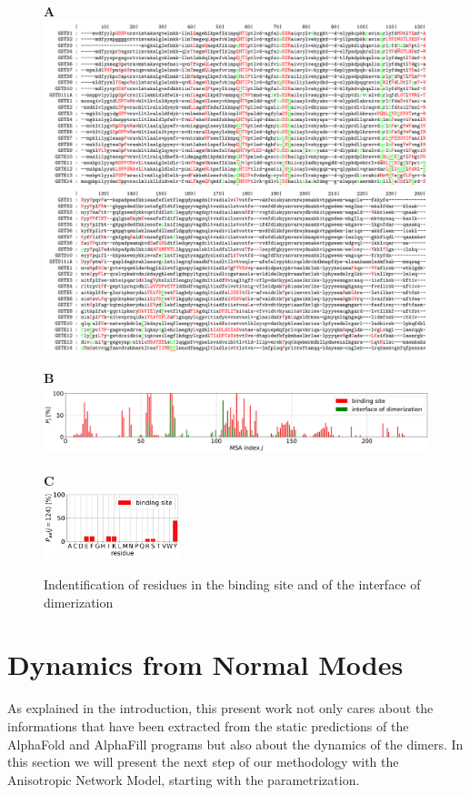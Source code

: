 \begin{figure}[h!]
	\label{MSA + AF + AFi}
	\raggedright\textbf{A}
	\includegraphics[width = .99\linewidth]{figures/MSA_matrix.pdf}\\[.5cm] %
	\begin{minipage}{.75\linewidth}
		\textbf{B}\\
		\includegraphics[height = 2cm]{figures/MSA_Proba.jpg} 
	\end{minipage}
	\begin{minipage}{.22\linewidth}
		\textbf{C}\\
		\includegraphics[height = 2cm]{figures/amino-acid_conservation_BS_j=124.jpg} 
	\end{minipage}
	\caption{Indentification of residues in the binding site and of the interface of dimerization}
\end{figure}
   

\section{Dynamics from Normal Modes}
\noindent As explained in the introduction, this present work not only cares about the informations that have been extracted from the static predictions of the AlphaFold and AlphaFill programs but also about the dynamics of the dimers. In this section we will present the next step of our methodology with the Anisotropic Network Model, starting with the parametrization.


